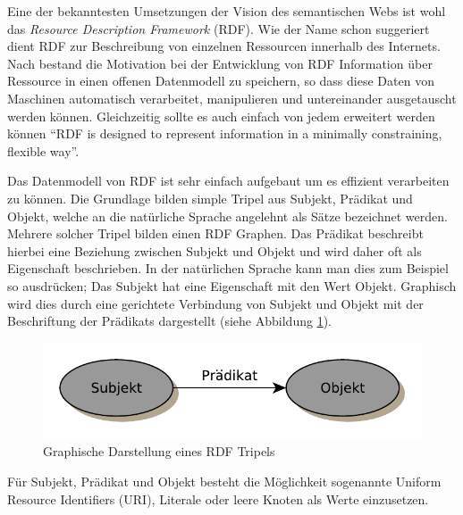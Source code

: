 Eine der bekanntesten Umsetzungen der Vision des  semantischen Webs ist wohl das \emph{Resource Description Framework} (RDF). Wie der Name schon suggeriert dient RDF zur Beschreibung von einzelnen Ressourcen innerhalb des Internets. Nach \cite{Klyne2004,Manola2004} bestand die Motivation bei der Entwicklung von RDF Information über Ressource in einen offenen Datenmodell zu speichern, so dass diese Daten von Maschinen automatisch verarbeitet, manipulieren und untereinander ausgetauscht werden können. Gleichzeitig sollte es auch einfach von jedem erweitert werden können \enquote{RDF is designed to represent information in a minimally constraining, flexible way}\cite{Klyne2004}.

\medskip

Das Datenmodell von RDF ist sehr einfach aufgebaut um es effizient verarbeiten zu können. Die Grundlage bilden simple Tripel aus Subjekt, Prädikat und Objekt, welche an die natürliche Sprache angelehnt als Sätze\cite{Heinzen} bezeichnet werden. Mehrere solcher Tripel bilden einen RDF Graphen. Das Prädikat beschreibt hierbei eine Beziehung zwischen Subjekt und Objekt und wird daher oft als Eigenschaft beschrieben. In der natürlichen Sprache kann man dies zum Beispiel so ausdrücken; Das Subjekt hat eine Eigenschaft mit den Wert Objekt. Graphisch wird dies durch eine gerichtete Verbindung von Subjekt und Objekt mit der Beschriftung der Prädikats dargestellt (siehe Abbildung \ref{fig:graphische_darstellung_eines_rdf_tripels}).

\medskip

\begin{figure}[ht]
    \centering
    \includegraphics[scale=0.7]{assets/images/rdf-triple}
    \caption{Graphische Darstellung eines RDF Tripels}
    \label{fig:graphische_darstellung_eines_rdf_tripels}
\end{figure} 

Für Subjekt, Prädikat und Objekt besteht die Möglichkeit sogenannte Uniform Resource Identifiers (URI), Literale oder leere Knoten als Werte einzusetzen. 

